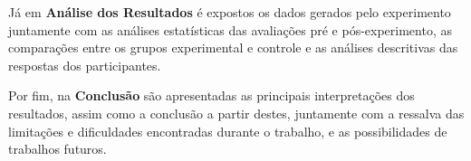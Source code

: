 Já em \textbf{Análise dos Resultados} é expostos os dados gerados pelo experimento juntamente com as análises estatísticas das avaliações pré e pós-experimento, as comparações entre os grupos experimental e controle e as análises descritivas das respostas dos participantes.

Por fim, na \textbf{Conclusão} são apresentadas as principais interpretações dos resultados, assim como a conclusão a partir destes, juntamente com a ressalva das limitações e dificuldades encontradas durante o trabalho, e as possibilidades de trabalhos futuros.